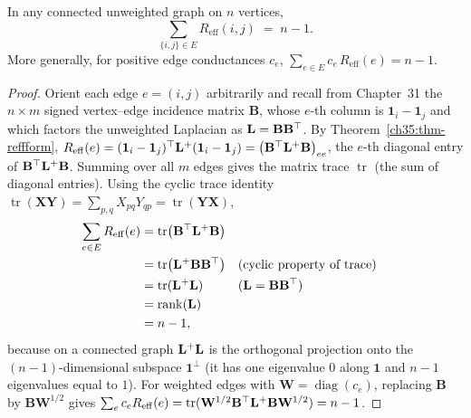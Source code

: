 \begin{theorem}[Foster]\label{ch35:thm-foster}
In any connected unweighted graph on $n$ vertices,
\[
  \sum_{\{i,j\}\in E} R_{\mathrm{eff}}(i,j)\;=\;n-1.
\]
More generally, for positive edge conductances $c_e$, $\sum_{e\in E} c_e\,R_{\mathrm{eff}}(e) = n-1$.
\end{theorem}

\begin{proof}
Orient each edge $e=(i,j)$ arbitrarily and recall from Chapter~31 the $n\times m$ signed vertex--edge incidence matrix $\mathbf{B}$, whose $e$-th column is $\mathbf{1}_i-\mathbf{1}_j$ and which factors the unweighted Laplacian as $\mathbf{L}=\mathbf{B}\mathbf{B}^\top$. By Theorem~\ref{ch35:thm-reffform}, $R_{\mathrm{eff}}(e)=(\mathbf{1}_i-\mathbf{1}_j)^\top\mathbf{L}^+(\mathbf{1}_i-\mathbf{1}_j)=\bigl(\mathbf{B}^\top\mathbf{L}^+\mathbf{B}\bigr)_{ee}$, the $e$-th diagonal entry of $\mathbf{B}^\top\mathbf{L}^+\mathbf{B}$. Summing over all $m$ edges gives the matrix trace $\operatorname{tr}$ (the sum of diagonal entries). Using the cyclic trace identity $\operatorname{tr}(\mathbf{X}\mathbf{Y})=\sum_{p,q}X_{pq}Y_{qp}=\operatorname{tr}(\mathbf{Y}\mathbf{X})$,
\begin{align*}
  \sum_{e\in E} R_{\mathrm{eff}}(e) &= \operatorname{tr}\bigl(\mathbf{B}^\top\mathbf{L}^+\mathbf{B}\bigr) \\
  &= \operatorname{tr}\bigl(\mathbf{L}^+\mathbf{B}\mathbf{B}^\top\bigr) && \text{(cyclic property of trace)} \\
  &= \operatorname{tr}(\mathbf{L}^+\mathbf{L}) && \text{($\mathbf{L}=\mathbf{B}\mathbf{B}^\top$)} \\
  &= \operatorname{rank}(\mathbf{L}) \\
  &= n-1,
\end{align*}
because on a connected graph $\mathbf{L}^+\mathbf{L}$ is the orthogonal projection onto the $(n-1)$-dimensional subspace $\mathbf{1}^\perp$ (it has one eigenvalue $0$ along $\mathbf{1}$ and $n-1$ eigenvalues equal to $1$). For weighted edges with $\mathbf{W}=\operatorname{diag}(c_e)$, replacing $\mathbf{B}$ by $\mathbf{B}\mathbf{W}^{1/2}$ gives $\sum_e c_e R_{\mathrm{eff}}(e)=\operatorname{tr}(\mathbf{W}^{1/2}\mathbf{B}^\top\mathbf{L}^+\mathbf{B}\mathbf{W}^{1/2})=n-1$.
\end{proof}

